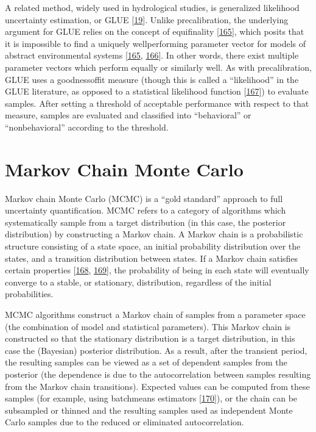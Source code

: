 \documentclass[letterpaper,10pt,english]{sphinxmanual}
\begin{document}
\sphinxAtStartPar
A related method, widely used in hydrological studies, is generalized likelihood uncertainty estimation, or GLUE {[}\hyperlink{cite.index:id38}{19}{]}. Unlike pre\sphinxhyphen{}calibration, the underlying argument for GLUE relies on the concept of equifinality {[}\hyperlink{cite.index:id43}{165}{]}, which posits that it is impossible to find a uniquely well\sphinxhyphen{}performing parameter vector for models of abstract environmental systems {[}\hyperlink{cite.index:id43}{165}, \hyperlink{cite.index:id44}{166}{]}. In other words, there exist multiple parameter vectors which perform equally or similarly well. As with pre\sphinxhyphen{}calibration, GLUE uses a goodness\sphinxhyphen{}of\sphinxhyphen{}fit measure (though this is called a “likelihood” in the GLUE literature, as opposed to a statistical likelihood function {[}\hyperlink{cite.index:id45}{167}{]}) to evaluate samples. After setting a threshold of acceptable performance with respect to that measure, samples are evaluated and classified into “behavioral” or “non\sphinxhyphen{}behavioral” according to the threshold.


\section{Markov Chain Monte Carlo}
\label{\detokenize{A1_Uncertainty_Quantification:markov-chain-monte-carlo}}
\sphinxAtStartPar
Markov chain Monte Carlo (MCMC) is a “gold standard” approach to full uncertainty quantification. MCMC refers to a category of algorithms which systematically sample from a target distribution (in this case, the posterior distribution) by constructing a Markov chain. A Markov chain is a probabilistic structure consisting of a state space, an initial probability distribution over the states, and a transition distribution between states. If a Markov chain satisfies certain properties {[}\hyperlink{cite.index:id170}{168}, \hyperlink{cite.index:id169}{169}{]}, the probability of being in each state will eventually converge to a stable, or stationary, distribution, regardless of the initial probabilities.

\sphinxAtStartPar
MCMC algorithms construct a Markov chain of samples from a parameter space (the combination of model and statistical parameters). This Markov chain is constructed so that the stationary distribution is a target distribution, in this case the (Bayesian) posterior distribution. As a result, after the transient period, the resulting samples can be viewed as a set of dependent samples from the posterior (the dependence is due to the autocorrelation between samples resulting from the Markov chain transitions). Expected values can be computed from these samples (for example, using batch\sphinxhyphen{}means estimators {[}\hyperlink{cite.index:id171}{170}{]}), or the chain can be sub\sphinxhyphen{}sampled or thinned and the resulting samples used as independent Monte Carlo samples due to the reduced or eliminated autocorrelation.
\end{document}
